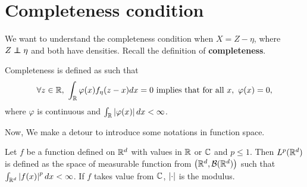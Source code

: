 \section{Completeness condition}

We want to understand the completeness condition when $X=Z-\eta$, where $Z \perp\!\!\!\!\perp \eta$ and both have densities. 
Recall the definition of \textbf{completeness}.
\begin{definition}[Completeness]
\label{completeness}
Completeness is defined as such that $$
\forall z \in \R,\ \int_\R \varphi(x)f_\eta(z-x)dx=0 \text{ implies that for all } x,\ \varphi(x)=0,$$
where $\varphi$ is continuous and $\int_{\mathbb{R}}  \left| {\varphi(x)}\right|dx <\infty$.
\end{definition}
Now, We make a detour to introduce some notations in function space.
\begin{definition}
    Let $f$ be a function defined on $\mathbb{R}^d$ with values in $\mathbb{R}$ or $\mathbb{C}$ and $p\le 1$. Then $L^p(\mathbb{R}^d)$ is defined as the space of measurable function from $\left(\mathbb{R}^d,\mathcal{B}(\mathbb{R}^d)\right)$ such that $\int_{\mathbb{R}^d}\left| f(x)\right|^p dx<\infty$. If $f$ takes value from $\mathbb{C}$, $\left| \cdot\right|$ is the modulus. 
\end{definition}


